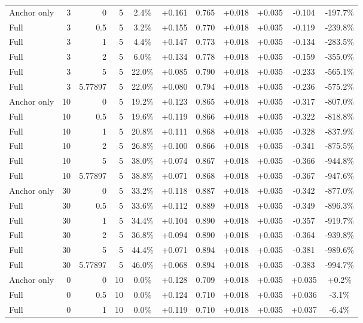 \begin{table}[htbp]
\begin{tabular}{lrrrccccccc}
Anchor only & 3 & 0 & 5 & 2.4\% & +0.161 & 0.765 & +0.018 & +0.035 & -0.104 & -197.7\% \\
Full & 3 & 0.5 & 5 & 3.2\% & +0.155 & 0.770 & +0.018 & +0.035 & -0.119 & -239.8\% \\
Full & 3 & 1 & 5 & 4.4\% & +0.147 & 0.773 & +0.018 & +0.035 & -0.134 & -283.5\% \\
Full & 3 & 2 & 5 & 6.0\% & +0.134 & 0.778 & +0.018 & +0.035 & -0.159 & -355.0\% \\
Full & 3 & 5 & 5 & 22.0\% & +0.085 & 0.790 & +0.018 & +0.035 & -0.233 & -565.1\% \\
Full & 3 & 5.77897 & 5 & 22.0\% & +0.080 & 0.794 & +0.018 & +0.035 & -0.236 & -575.2\% \\
Anchor only & 10 & 0 & 5 & 19.2\% & +0.123 & 0.865 & +0.018 & +0.035 & -0.317 & -807.0\% \\
Full & 10 & 0.5 & 5 & 19.6\% & +0.119 & 0.866 & +0.018 & +0.035 & -0.322 & -818.8\% \\
Full & 10 & 1 & 5 & 20.8\% & +0.111 & 0.868 & +0.018 & +0.035 & -0.328 & -837.9\% \\
Full & 10 & 2 & 5 & 26.8\% & +0.100 & 0.866 & +0.018 & +0.035 & -0.341 & -875.5\% \\
Full & 10 & 5 & 5 & 38.0\% & +0.074 & 0.867 & +0.018 & +0.035 & -0.366 & -944.8\% \\
Full & 10 & 5.77897 & 5 & 38.8\% & +0.071 & 0.868 & +0.018 & +0.035 & -0.367 & -947.6\% \\
Anchor only & 30 & 0 & 5 & 33.2\% & +0.118 & 0.887 & +0.018 & +0.035 & -0.342 & -877.0\% \\
Full & 30 & 0.5 & 5 & 33.6\% & +0.112 & 0.889 & +0.018 & +0.035 & -0.349 & -896.3\% \\
Full & 30 & 1 & 5 & 34.4\% & +0.104 & 0.890 & +0.018 & +0.035 & -0.357 & -919.7\% \\
Full & 30 & 2 & 5 & 36.8\% & +0.094 & 0.890 & +0.018 & +0.035 & -0.364 & -939.8\% \\
Full & 30 & 5 & 5 & 44.4\% & +0.071 & 0.894 & +0.018 & +0.035 & -0.381 & -989.6\% \\
Full & 30 & 5.77897 & 5 & 46.0\% & +0.068 & 0.894 & +0.018 & +0.035 & -0.383 & -994.7\% \\
Anchor only & 0 & 0 & 10 & 0.0\% & +0.128 & 0.709 & +0.018 & +0.035 & +0.035 & +0.2\% \\
Full & 0 & 0.5 & 10 & 0.0\% & +0.124 & 0.710 & +0.018 & +0.035 & +0.036 & -3.1\% \\
Full & 0 & 1 & 10 & 0.0\% & +0.119 & 0.710 & +0.018 & +0.035 & +0.037 & -6.4\% \\

\end{tabular}
\end{table}
